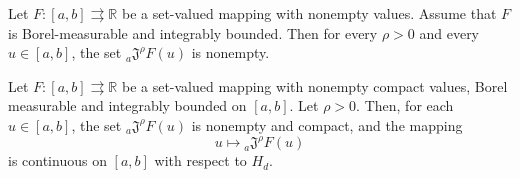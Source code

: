 \documentclass[10pt,a4paper]{amsart}
\begin{document}
\begin{theorem}\label{THnonempty}
Let $F:[a,b]\rightrightarrows\mathbb{R}$ be a set-valued mapping with nonempty values. Assume that $F$ is Borel-measurable and integrably
bounded. Then for every $\rho>0$ and every $u\in[a,b]$, the set ${}_{a}\mathfrak{J}^{\rho}F(u)$ is nonempty.
\end{theorem}

\begin{theorem}\label{conti}
   Let $F:[a,b]\rightrightarrows\mathbb{R}$ be a set-valued mapping with nonempty compact values, Borel measurable and integrably bounded on $[a,b]$.
Let $\rho>0$. Then, for each $u\in[a,b]$, the set ${}_{a}\mathfrak{J}^{\rho}F(u)$ is nonempty and compact,  and the mapping
$$u \longmapsto {}_{a}\mathfrak{J}^{\rho}F(u)$$
 is continuous on $[a,b]$ with respect to $H_d$.
\end{theorem}
\end{document}
